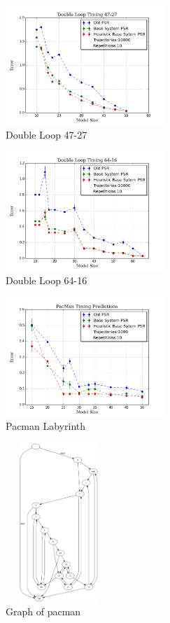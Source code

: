 \begin{figure}[ht!]
\centering
\includegraphics[width=60mm]{uCOREPICS/DoubleLoop47-27Heuristics.png}
\caption{Double Loop 47-27\label{overflow}}
\end{figure}

\begin{figure}[ht!]
\centering
\includegraphics[width=60mm]{uCOREPICS/DoubleLoop64-16Heuristics.png}
\caption{Double Loop 64-16\label{overflow}}
\end{figure}

\begin{figure}[ht!]
\centering
\includegraphics[width=60mm]{uCOREPICS/PacManTimingHeuristicsIncluded.png}
\caption{Pacman Labyrinth\label{overflow}}
\end{figure}

\begin{figure}[ht!]
\centering
\includegraphics[width=40mm,height=60mm]{uCOREPICS/graphPacMan.png}
\caption{Graph of pacman\label{overflow}}
\end{figure}

